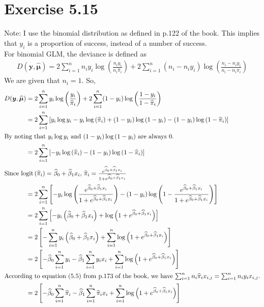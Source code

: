 \documentclass[a4paper]{article}
\begin{document}
\vspace{\baselineskip}
\section{Exercise 5.15}
Note: I use the binomial distribution as defined in p.122 of the book. This implies that $y_{i}$ is a proportion of success, instead of a number of success.\\

For binomial GLM, the deviance is defined as
\begin{align*}
D(\bm{y},\widehat{\bm{\mu}}) = 2\sum_{i=1}^{n} n_{i}y_{i} \log\left(\frac{n_{i}y_{i}}{n_{i}\widehat{\pi}_{i}}\right) + 2\sum_{i=1}^{n}(n_{i}-n_{i}y_{i})\log\left(\frac{n_{i} - n_{i}y_{i}}{n_{i} - n_{i}\widehat{\pi}_{i}}\right)
\end{align*}
We are given that $n_{i} = 1$. So, 
\begin{align*}
D(\bm{y},\widehat{\bm{\mu}}) &= 2\sum_{i=1}^{n} y_{i} \log\left(\frac{y_{i}}{\widehat{\pi}_{i}}\right) + 2\sum_{i=1}^{n}(1-y_{i})\log\left(\frac{1 - y_{i}}{1 - \widehat{\pi}_{i}}\right)\\
&= 2\sum_{i=1}^{n}\left[y_{i}\log y_{i} -y_{i}\log\left(\widehat{\pi}_{i}\right) +(1-y_{i})\log\left(1 - y_{i}\right) -(1-y_{i})\log\left(1 - \widehat{\pi}_{i}\right)\right]\\
\intertext{By noting that $y_{i}\log y_{i}$ and $(1-y_{i})\log\left(1 - y_{i}\right)$ are always 0.}
&= 2\sum_{i=1}^{n}\left[-y_{i}\log\left(\widehat{\pi}_{i}\right) -(1-y_{i})\log\left(1 - \widehat{\pi}_{i}\right)\right]\\
\intertext{Since $\mathrm{logit}\left(\widehat{\pi}_{i}\right) = \widehat{\beta}_{0} + \widehat{\beta}_{1}x_{i}$, $\widehat{\pi}_{i} = \frac{e^{\widehat{\beta}_{0} + \widehat{\beta}_{1}x_{i}}}{1+e^{\widehat{\beta}_{0} + \widehat{\beta}_{1}x_{i}}}$}
&= 2\sum_{i=1}^{n}\left[-y_{i}\log\left(\frac{e^{\widehat{\beta}_{0} + \widehat{\beta}_{1}x_{i}}}{1+e^{\widehat{\beta}_{0} + \widehat{\beta}_{1}x_{i}}}\right) -(1-y_{i})\log\left(1 - \frac{e^{\widehat{\beta}_{0} + \widehat{\beta}_{1}x_{i}}}{1+e^{\widehat{\beta}_{0} + \widehat{\beta}_{1}x_{i}}}\right)\right]\\
&= 2\sum_{i=1}^{n}\left[-y_{i}\left(\widehat{\beta}_{0} + \widehat{\beta}_{1}x_{i}\right) + \log\left(1+e^{\widehat{\beta}_{0} + \widehat{\beta}_{1}x_{i}}\right)\right]\\
&= 2\left[-\sum_{i=1}^{n}y_{i}\left(\widehat{\beta}_{0} + \widehat{\beta}_{1}x_{i}\right) + \sum_{i=1}^{n}\log\left(1+e^{\widehat{\beta}_{0} + \widehat{\beta}_{1}x_{i}}\right)\right]\\
&= 2\left[-\widehat{\beta}_{0}\sum_{i=1}^{n}y_{i} -\widehat{\beta}_{1}\sum_{i=1}^{n}y_{i}x_{i} + \sum_{i=1}^{n}\log\left(1+e^{\widehat{\beta}_{0} + \widehat{\beta}_{1}x_{i}}\right)\right]\\
\intertext{According to equation (5.5) from p.173 of the book, we have $\sum_{i=1}^{n}n_{i}\widehat{\pi}_{i}x_{i,j} = \sum_{i=1}^{n}n_{i}y_{i}x_{i,j}$.}
&= 2\left[-\widehat{\beta}_{0}\sum_{i=1}^{n}\widehat{\pi}_{i} -\widehat{\beta}_{1}\sum_{i=1}^{n}\widehat{\pi}_{i}x_{i} + \sum_{i=1}^{n}\log\left(1+e^{\widehat{\beta}_{0} + \widehat{\beta}_{1}x_{i}}\right)\right]
\end{align*}
\end{document}
